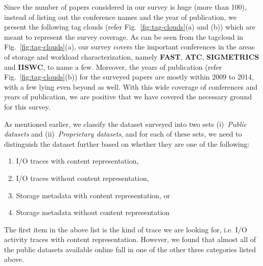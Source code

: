 Since the number of papers considered in our survey is huge (more than 100),
instead of listing out the conference names and the year of publication, we
present the following tag clouds (refer Fig.~\ref{fig:tag-clouds}(a) and (b))
which are meant to represent the survey 
coverage. As can be seen from the
tagcloud in Fig.~\ref{fig:tag-clouds}(a), our survey covers the
important conferences in the areas of storage and workload characterization,
namely \textbf{FAST}, \textbf{ATC}, \textbf{SIGMETRICS} and \textbf{IISWC},
to name a few. Moreover, the years of publication (refer 
Fig.~\ref{fig:tag-clouds}(b)) for the surveyed papers
are mostly within 2009 to 2014, with a few lying even beyond as well.
With this wide coverage of conferences and years of publication, we are
positive that we have covered the necessary ground for this survey.

As mentioned earlier, we classify
the dataset surveyed into two sets (i)~\textit{Public datasets} and
(ii)~\textit{Proprietary datasets}, and for each of these sets, we 
need to distinguish the dataset further based on whether they are one of 
the following:
\begin{enumerate}
	\item I/O traces with content representation, 
	\item I/O traces without content representation,
	\item Storage metadata with content representation, or
	\item Storage metadata without content representation
\end{enumerate}
The first item in the above list is the kind of trace we are looking for,
i.e. I/O activity traces with content representation. However, we found
that almost all of the public datasets available online fall in one of 
the other three categories listed above.

